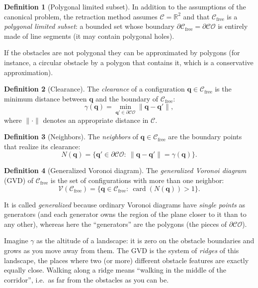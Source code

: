 \documentclass[11pt,a4paper]{article}
\newcommand{\Cspace}{\mathcal{C}}
\newcommand{\Cfree}{\mathcal{C}_{\mathrm{free}}}
\newcommand{\CO}{\mathcal{CO}}
\newcommand{\Vor}{\mathcal{V}}
\newcommand{\R}{\mathbb{R}}
\newcommand{\vq}{\boldsymbol{q}}
\DeclareMathOperator{\card}{card}
\theoremstyle{definition}
\newtheorem{definition}{Definition}[section]
\theoremstyle{plain}
\theoremstyle{remark}
\begin{document}
\begin{definition}[Polygonal limited subset]
In addition to the assumptions of the canonical problem, the retraction method assumes $\Cspace=\R^2$ and that $\Cfree$ is a \emph{polygonal limited subset}: a bounded set whose boundary $\partial\Cfree=\partial\CO$ is entirely made of line segments (it may contain polygonal holes).
\end{definition}

If the obstacles are not polygonal they can be approximated by polygons (for instance, a circular obstacle by a polygon that contains it, which is a conservative approximation).

\begin{definition}[Clearance]
The \emph{clearance} of a configuration $\vq\in\Cfree$ is the minimum distance between $\vq$ and the boundary of $\Cfree$:
\[
  \gamma(\vq)=\min_{\vq'\in\partial\CO}\|\vq-\vq'\|,
\]
where $\|\cdot\|$ denotes an appropriate distance in $\Cspace$.
\end{definition}

\begin{definition}[Neighbors]
The \emph{neighbors} of $\vq\in\Cfree$ are the boundary points that realize its clearance:
\[
  N(\vq)=\{\vq'\in\partial\CO:\ \|\vq-\vq'\|=\gamma(\vq)\}.
\]
\end{definition}

\begin{definition}[Generalized Voronoi diagram]
The \emph{generalized Voronoi diagram} (GVD) of $\Cfree$ is the set of configurations with more than one neighbor:
\[
  \Vor(\Cfree)=\{\vq\in\Cfree:\ \card(N(\vq))>1\}.
\]
\end{definition}

It is called \emph{generalized} because ordinary Voronoi diagrams have \emph{single points} as generators (and each generator owns the region of the plane closer to it than to any other), whereas here the ``generators'' are the polygons (the pieces of $\partial\CO$).

\begin{intuition}
Imagine $\gamma$ as the altitude of a landscape: it is zero on the obstacle boundaries and grows as you move away from them. The GVD is the system of \emph{ridges} of this landscape, the places where two (or more) different obstacle features are exactly equally close. Walking along a ridge means ``walking in the middle of the corridor'', i.e.\ as far from the obstacles as you can be.
\end{intuition}
\end{document}
